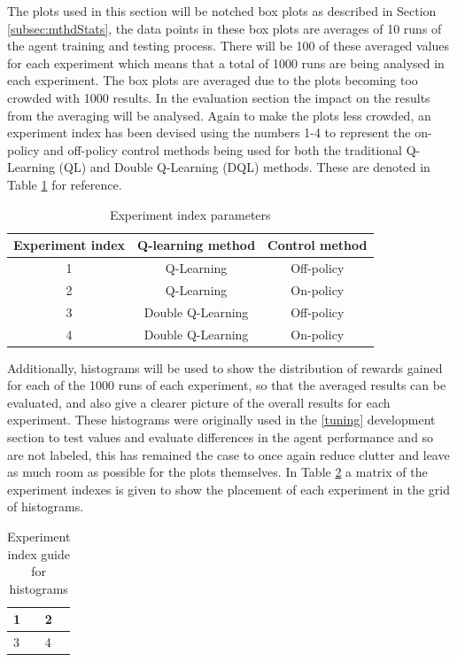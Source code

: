 \documentclass[hidelinks,journal]{IEEEtran}
\begin{document}
The plots used in this section will be notched box plots as described in Section \ref{subsec:mthdStats}, the data points in these box plots are averages of 10 runs of the agent training and testing process. There will be 100 of these averaged values for each experiment which means that a total of 1000 runs are being analysed in each experiment. The box plots are averaged due to the plots becoming too crowded with 1000 results. In the evaluation section the impact on the results from the averaging will be analysed. Again to make the plots less crowded, an experiment index has been devised using the numbers 1-4 to represent the on-policy and off-policy control methods being used for both the traditional Q-Learning (QL) and Double Q-Learning (DQL) methods. These are denoted in Table \ref{tab:indexExp} for reference.
\begin{table}[!ht]
  \centering
  \begin{tabular}{c | c  c}
	Experiment index & Q-learning method & Control method \\ \hline
	1 & Q-Learning & Off-policy \\
	2 & Q-Learning & On-policy \\
	3 & Double Q-Learning & Off-policy \\
	4 & Double Q-Learning & On-policy \\
  \end{tabular}
  \caption{Experiment index parameters}
  \label{tab:indexExp}
\end{table}

Additionally, histograms will be used to show the distribution of rewards gained for each of the 1000 runs of each experiment, so that the averaged results can be evaluated, and also give a clearer picture of the overall results for each experiment. These histograms were originally used in the \ref{tuning} development section to test values and evaluate differences in the agent performance and so are not labeled, this has remained the case to once again reduce clutter and leave as much room as possible for the plots themselves. In Table \ref{tab:indexHist} a matrix of the experiment indexes is given to show the placement of each experiment in the grid of histograms.
\begin{table}[h]
  \centering
  \begin{tabular}{| l | l |}
	\hline
	1 & 2 \\ \hline
	3 & 4 \\
	\hline
  \end{tabular}
  \caption{Experiment index guide for histograms}
  \label{tab:indexHist}
\end{table}
\end{document}
